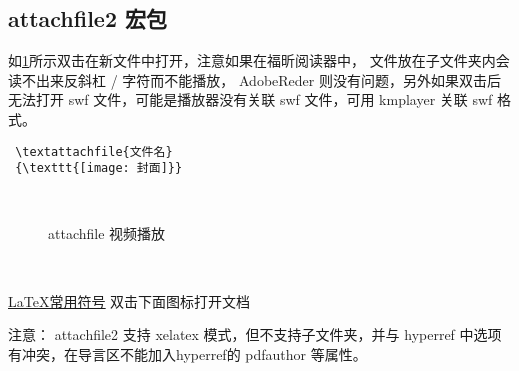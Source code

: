 \subsection{attachfile2 宏包}

如\ref{movie_attach}所示双击在新文件中打开，注意如果在福昕阅读器中，
文件放在子文件夹内会读不出来反斜杠 \textcolor[rgb]{1.00,0.00,0.00}{/} 字符而不能播放，
AdobeReder 则没有问题，另外如果双击后无法打开 swf 文件，可能是播放器没有关联 swf 文件，可用 kmplayer 关联 swf 格式。
 \begin{shaded}
 \begin{Verbatim}
 \textattachfile{文件名}
 {\texttt{[image: 封面]}}
 \end{Verbatim}
 \end{shaded}

\begin{figure}[ht]
  \centering
{} \\
 \caption{attachfile 视频播放}\label{movie_attach}
\end{figure}
~\\


\begin{cmd}[label=attachfile2 使用样例代码]
\hyperlink{symbols}{\color{blue}\uline{\LaTeX 常用符号}}
\hypertarget{symbols}{\textcolor[rgb]
{0.00,0.00,1.00}{双击下面图标打开文档}}
\normalcolor
~\\[0.3cm]
\begin{center}
\end{center}
\end{cmd}
%
%

\textcolor[rgb]{1.00,0.00,0.00}{注意：
attachfile2 支持 xelatex 模式，但不支持子文件夹，并与 hyperref 中选项有冲突，在导言区不能加入hyperref的 pdfauthor 等属性。}

